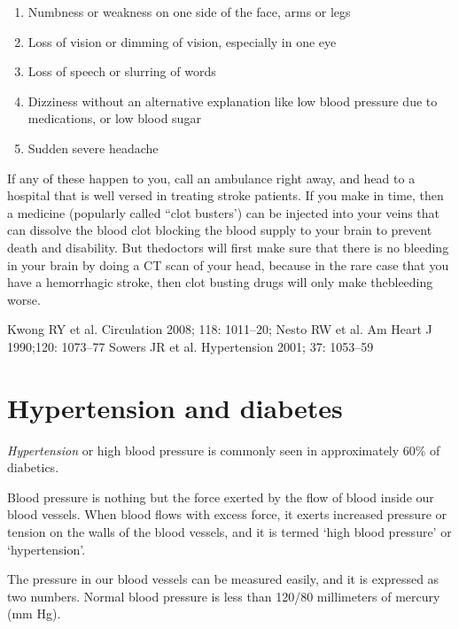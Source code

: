\begin{enumerate}[•]
\itemsep=0pt
\item Numbness or weakness on one side of the face, arms or legs
\item Loss of vision or dimming of vision, especially in one eye
\item Loss of speech or slurring of words
\item Dizziness without an alternative explanation like low blood pressure due to medications, or low blood sugar
\item Sudden severe headache
\end{enumerate}

If any of these happen to you, call an ambulance right away, and head to a hospital that is well versed in treating stroke patients. If you make in time, then a medicine (popularly called “clot busters’) can be injected into your veins that can dissolve the blood clot blocking the blood supply to your brain to prevent death and disability. But the\break doctors will first make sure that there is no bleeding in your brain by doing a CT scan of your head, because in the rare case that you have a hemorrhagic stroke, then clot busting drugs will only make the\break bleeding worse.

\begin{thebibliography}{99}
 Kwong RY et al. Circulation 2008; 118: 1011–20; Nesto RW et al. Am Heart J 1990;120: 1073–77
 Sowers JR et al. Hypertension 2001; 37: 1053–59
\end{thebibliography}

\newpage
 
\renewcommand{\thechapter}{\arabic{chapter}A}
\chapter{Hypertension and diabetes}\label{chap13A}

\textit{Hypertension} or high blood pressure is commonly seen in approximately 60\% of diabetics.

Blood pressure is nothing but the force exerted by the flow of blood inside our blood vessels. When blood flows with excess force, it exerts increased pressure or tension on the walls of the blood vessels, and it is termed ‘high blood pressure’ or ‘hypertension’.

The pressure in our blood vessels can be measured easily, and it is expressed as two numbers. Normal blood pressure is less than 120/80 millimeters of mercury (mm Hg).

